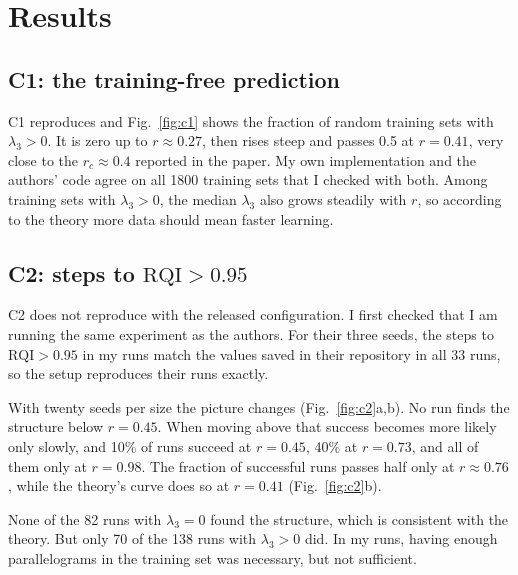 \section{Results}
\label{sec:results}



\subsection{C1: the training-free prediction}
\label{sec:res-c1}

C1 reproduces and Fig.~\ref{fig:c1} shows the fraction of random training sets
with $\lambda_3 > 0$. It is zero up to $r \approx 0.27$, then rises steep and
passes 0.5 at $r = 0.41$, very close to the $r_c \approx 0.4$ reported in the
paper. My own implementation and the authors' code agree on all 1800 training sets that I checked with both. Among training sets with $\lambda_3 > 0$, the
median $\lambda_3$ also grows steadily with $r$, so according to the theory
more data should mean faster learning.

\subsection{C2: steps to $\mathrm{RQI} > 0.95$}
\label{sec:res-c2}

C2 does not reproduce with the released configuration. I first checked that I am running the same experiment as the authors. For their three seeds, the steps to $\mathrm{RQI} > 0.95$ in my runs match the values saved in their repository in all 33 runs, so the setup reproduces their runs exactly.

With twenty seeds per size the picture changes (Fig.~\ref{fig:c2}a,b). No run
finds the structure below $r = 0.45$. When moving above that success becomes more likely
only slowly, and 10\% of runs succeed at $r = 0.45$, 40\% at $r = 0.73$, and all
of them only at $r = 0.98$. The fraction of successful runs passes half only at $r \approx 0.76$,
while the theory's curve does so at $r = 0.41$ (Fig.~\ref{fig:c2}b).

None of the 82 runs with $\lambda_3 = 0$ found the structure, which is consistent with the
theory. But only 70 of the 138 runs with $\lambda_3 > 0$ did. In my runs, having
enough parallelograms in the training set was necessary, but not sufficient.

